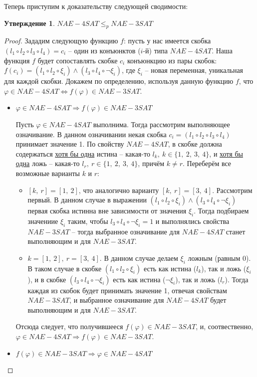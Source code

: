 \documentclass[a4paper,12pt]{article}
\newtheorem{statement}{Утверждение}
\begin{document}
Теперь приступим к доказательству следующей сводимости:
\begin{statement}
    $NAE-4SAT \leqslant_p NAE-3SAT$
\end{statement}
\begin{proof}
    Зададим следующую функцию $f$: пусть у нас имеется скобка $(l_1 \circ l_2 \circ l_3 \circ l_4) = c_i$ -- один из конъюнктов ($i$-й) типа $NAE-4SAT$. Наша функция $f$ будет сопоставлять скобке $c_i$ конъюнкцию из пары скобок: $f(c_i) = (l_1 \circ l_2 \circ \xi_i) \wedge (l_3 \circ l_4 \circ \neg \xi_i)$, где $\xi_i$ -- новая переменная, уникальная для каждой скобки. Докажем по определению, используя данную функцию $f$, что $\varphi \in NAE-4SAT \Longleftrightarrow f(\varphi) \in NAE-3SAT$.
    \begin{itemize}
        \item $\varphi \in NAE-4SAT \Longrightarrow f(\varphi) \in NAE-3SAT$
        
        Пусть $\varphi \in NAE-4SAT$ выполнима. Тогда рассмотрим выполняющее означивание. В данном означивании некая скобка $c_i = (l_1 \circ l_2 \circ l_3 \circ l_4)$ принимает значение 1. По свойству $NAE-4SAT$, в скобке должна содержаться \underline{хотя бы одна} истина -- какая-то $l_k,\ k \in \{1,\ 2,\ 3,\ 4\}$, и \underline{хотя бы одна} ложь -- какая-то $l_r,\ r \in \{1,\ 2,\ 3,\ 4\}$, причём $k \neq r$. Переберём все возможные варианты $k$ и $r$:
        \begin{itemize}
            \item $[k,\ r] = [1,\ 2]$, что аналогично варианту $[k,\ r] = [3,\ 4]$. Рассмотрим первый. В данном случае в выражении $(l_1 \circ l_2 \circ \xi_i) \wedge (l_3 \circ l_4 \circ \neg \xi_i)$ первая скобка истинна вне зависимости от значения $\xi_i$. Тогда подбираем значениие $\xi_i$ таким, чтобы $l_3 \circ l_4 \circ \neg \xi_i = 1$ и выполнялись свойства $NAE-3SAT$ -- тогда выбранное означивание для $NAE-4SAT$ станет выполняющим и для $NAE-3SAT$.
            \item $k = [1,\ 2],\ r = [3,\ 4]$. В данном случае делаем $\xi_i$ ложным (равным 0). В таком случае в скобке $(l_1 \circ l_2 \circ \xi_i)$ есть как истина ($l_k$), так и ложь ($\xi_i$), и в скобке $(l_3 \circ l_4 \circ \neg \xi_i)$ есть как истина ($\neg \xi_i$), так и ложь ($l_r$). Тогда каждая из скобок будет принимать значение 1, отвечая свойствам $NAE-3SAT$, и выбранное означивание для $NAE-4SAT$ будет выполняющим и для $NAE-3SAT$.
        \end{itemize}
        Отсюда следует, что получившееся $f(\varphi) \in NAE-3SAT$, и, соотвественно, $\varphi \in NAE-4SAT \Longrightarrow f(\varphi) \in NAE-3SAT$.
        \item $f(\varphi) \in NAE-3SAT \Longrightarrow  \varphi \in NAE-4SAT$
        

\end{itemize}
\end{proof}
\end{document}
